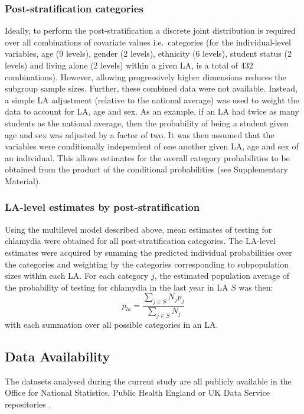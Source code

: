 \documentclass[fleqn,10pt]{wlscirep}
\begin{document}
\subsubsection*{Post-stratification categories}
Ideally, to perform the post-stratification a discrete joint distribution is required over all combinations of covariate values i.e.\ categories (for the individual-level variables, age (9 levels), gender (2 levels), ethnicity (6 levels), student status (2 levels) and living alone (2 levels) within a given LA, is a total of 432 combinations). However, allowing progressively higher dimensions reduces the subgroup sample sizes. Further, these combined data were not available. Instead, a simple LA adjustment (relative to the national average) was used to weight the data to account for LA, age and sex. As an example, if an LA had twice as many students as the national average, then the probability of being a student given age and sex was adjusted by a factor of two.
It was then assumed that the variables were conditionally independent of one another given LA, age and sex of an individual. This allows estimates for the overall category probabilities to be obtained from the product of the conditional probabilities (see Supplementary Material). 

\subsubsection*{LA-level estimates by post-stratification}
Using the multilevel model described above, mean estimates of testing for chlamydia were obtained for all post-stratification categories. The LA-level estimates were acquired by summing the predicted individual probabilities over the categories and weighting by the categories corresponding to subpopulation sizes within each LA.
For each category $j$, the estimated population average of the probability of testing for chlamydia in the last year in LA $S$ was then:
\begin{displaymath}
p_{la} = \frac{\sum_{j\in S} N_j p_j}{\sum_{j\in S} N_j}
\end{displaymath}
with each summation over all possible categories in an LA.

\subsection*{Data Availability}

The datasets analysed during the current study are all publicly available in the Office for National Statistics, Public Health England or UK Data Service repositories \cite{OfficeforNationalStatistics2011,OfficeforNationalStatistics2011a,DepartmentforCommunitiesandLocalGovernment,ONS_cesnsusdata,ONS_conceptions,ONS_urbanrural,PublicHealthEngland,Johnson2017}.
\end{document}
